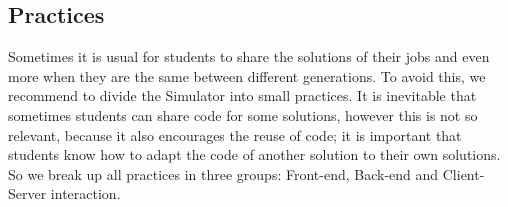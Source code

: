 

\subsection{Practices}
Sometimes it is usual for students to share the solutions of their jobs and even more when they 
are the same between different generations. To avoid this, we recommend to divide the Simulator 
into small practices. 
It is inevitable that sometimes students can share code for some solutions, however this is not 
so relevant, because it also encourages the reuse of code; it is important that students know 
how to adapt the code of another solution to their own solutions. 
So we break up all practices in three groups: Front-end, Back-end and Client-Server interaction.

